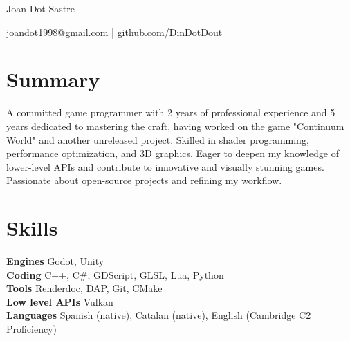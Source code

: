 \documentclass[10pt]{article}       %
\begin{document}
\centerline{\Huge Joan Dot Sastre}

\vspace{5pt}

\centerline{\href{mailto:joandot1998@gmail.com}{joandot1998@gmail.com} | \href{https://github.com/DinDotDout}{github.com/DinDotDout}}

\vspace{-10pt}
\section*{Summary}
A committed game programmer with 2 years of professional experience and 5 years dedicated to mastering the craft, having worked on the game "Continuum World" and another unreleased project. Skilled in shader programming, performance optimization, and 3D graphics. Eager to deepen my knowledge of lower-level APIs and contribute to innovative and visually stunning games. Passionate about open-source projects and refining my workflow.
\section*{Skills}
\textbf{Engines} Godot, Unity \\
\textbf{Coding} C++, C\#, GDScript, GLSL, Lua, Python \\
\textbf{Tools} Renderdoc, DAP, Git, CMake \\
\textbf{Low level APIs} Vulkan \\
\textbf{Languages} Spanish (native), Catalan (native), English (Cambridge C2 Proficiency)

\vspace{-6.5pt}
\end{document}
